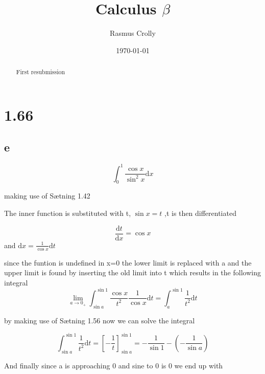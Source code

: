 \documentclass[12pt,a4paper]{article}
\title{Calculus $\beta$}
\author{Rasmus Crolly}
\date{\today}
\begin{document}
\maketitle

\begin{abstract}
First resubmission
\end{abstract}

\section{1.66}

\subsection{e}

\begin{equation} \label{}
\int_{0}^{1}\frac{\cos{x}}{\sin^2x}\mathrm{d}x
\end{equation}

making use of Sætning 1.42

The inner function is substituted with t, \begin{math}
\sin {x}=t
\end{math}
,t is then differentiated

\begin{equation} \label{}
\frac{\mathrm{d}t}{\mathrm{d}x}=\cos{x}
\end{equation}
and \begin{math}
\mathrm{d}x=\frac{1}{\cos{x}}\mathrm{d}t
\end{math}


since the funtion is undefined in x=0 the lower limit is replaced with a
and the upper limit is found by inserting the old limit into t which results in the following integral
\begin{equation} \label{}
\lim_{a\to0_+}\int_{\sin{a}}^{\sin{1}}\frac{\cos{x}}{t^2}\frac{1}{\cos{x}}\mathrm{d}t= \int_{a}^{\sin{1}}\frac{1}{t^2}\mathrm{d}t
\end{equation}




by making use of Sætning 1.56 now we can solve the integral

\begin{equation} \label{}
\int_{\sin{a}}^{\sin{1}}\frac{1}{t^2}\mathrm{d}t=\left[-\frac{1}{t}\right]_{\sin{a}}^{\sin{1}}=-\frac{1}{\sin{1}}-(-\frac{1}{\sin{a}})
\end{equation}

And finally since a is approaching 0 and sine to 0 is 0 we end up with
\end{document}
